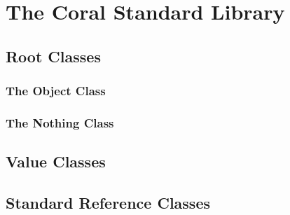 \chapter{The Coral Standard Library}

\section{Root Classes}

\subsection{The Object Class}

\subsection{The Nothing Class}

\section{Value Classes}

\section{Standard Reference Classes}



















